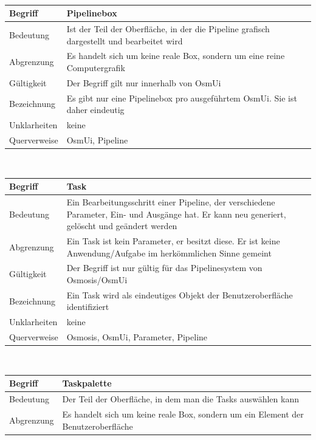 \documentclass[a4paper,12pt]{scrartcl}
\begin{document}
\begin{center}
\vspace{0.7cm}
\\
\begin{tabular}{|p{5cm}|p{10cm}|}
\hline Begriff & \textbf{Pipelinebox} \\ 
\hline Bedeutung & Ist der Teil der Oberfläche, in der die Pipeline grafisch dargestellt und bearbeitet wird \\ 
\hline Abgrenzung & Es handelt sich um keine reale Box, sondern um eine reine Computergrafik \\ 
\hline Gültigkeit & Der Begriff gilt nur innerhalb von OsmUi \\ 
\hline Bezeichnung & Es gibt nur eine Pipelinebox pro ausgeführtem OsmUi. Sie ist daher eindeutig \\ 
\hline Unklarheiten & keine \\ 
\hline Querverweise & OsmUi, Pipeline \\ 
\hline 
\end{tabular}
\vspace{0.7cm}
\\
\begin{tabular}{|p{5cm}|p{10cm}|}
\hline Begriff & \textbf{Task} \\ 
\hline Bedeutung & Ein Bearbeitungsschritt einer Pipeline, der verschiedene Parameter, Ein- und Ausgänge hat. Er kann neu generiert, gelöscht und geändert werden\\ 
\hline Abgrenzung & Ein Task ist kein Parameter, er besitzt diese. Er ist keine Anwendung/Aufgabe im herkömmlichen Sinne gemeint\\ 
\hline Gültigkeit & Der Begriff ist nur gültig für das Pipelinesystem von Osmosis/OsmUi\\ 
\hline Bezeichnung & Ein Task wird als eindeutiges Objekt der Benutzeroberfläche identifiziert\\ 
\hline Unklarheiten & keine \\ 
\hline Querverweise & Osmosis, OsmUi, Parameter, Pipeline\\ 
\hline 
\end{tabular}
\vspace{0.7cm}
\\
\begin{tabular}{|p{5cm}|p{10cm}|}
\hline Begriff & \textbf{Taskpalette} \\ 
\hline Bedeutung & Der Teil der Oberfläche, in dem man die Tasks auswählen kann  \\ 
\hline Abgrenzung & Es handelt sich um keine reale Box, sondern um ein Element der Benutzeroberfläche\\ 

\end{tabular}
\end{center}
\end{document}
